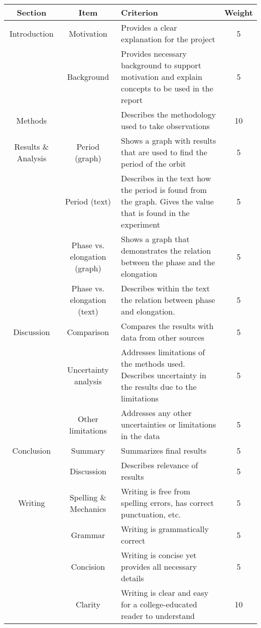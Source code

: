 \documentclass{exam}
\begin{document}
\begin{table}[!h]
\centering
\begin{tabular}{|c|c|p{6.25cm}|c|}
\hline
Section & Item & Criterion & Weight\\
\hline
\hline
Introduction        & Motivation & Provides a clear explanation for the project & 5\\
                    & Background & Provides necessary background to support motivation and explain concepts to be used in the report & 5\\
\hline
Methods             &            & Describes the methodology used to take observations & 10\\
\hline
Results \& Analysis & Period (graph)     & Shows a graph with results that are used to find the period of the orbit & 5\\
                    & Period (text)      & Describes in the text how the period is found from the graph. Gives the value that is found in the experiment & 5\\
                    & Phase vs. elongation (graph) & Shows a graph that demonstrates the relation between the phase and the elongation & 5\\
                    & Phase vs. elongation (text)  & Describes within the text the relation between phase and elongation. & 5\\
\hline
Discussion          & Comparison         & Compares the results with data from other sources & 5\\
                    & Uncertainty analysis & Addresses limitations of the methods used. Describes uncertainty in the results due to the limitations & 5\\
                    & Other limitations  & Addresses any other uncertainties or limitations in the data & 5\\
\hline
Conclusion          & Summary           & Summarizes final results & 5\\
                    & Discussion        & Describes relevance of results & 5\\
\hline
Writing             & Spelling \& Mechanics & Writing is free from spelling errors, has correct punctuation, etc. & 5\\
                   & Grammar & Writing is grammatically correct & 5\\
                  & Concision & Writing is concise yet provides all necessary details & 5\\
                   & Clarity & Writing is clear and easy for a college-educated reader to understand & 10\\

\end{tabular}
\end{table}
\end{document}
